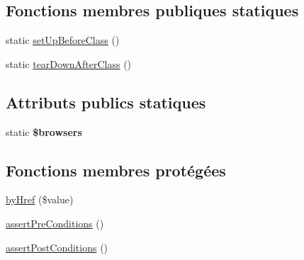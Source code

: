 \subsection*{Fonctions membres publiques statiques}
\begin{DoxyCompactItemize}
\item 
static \hyperlink{classtest_1_1functional_1_1TourneesDeLivraisonFunctionalTest_ac009c03b7cb820b74b75e188d480ca95}{set\+Up\+Before\+Class} ()
\item 
static \hyperlink{classtest_1_1functional_1_1TourneesDeLivraisonFunctionalTest_a33a0b4537f43e5c27ca01824b33cb8db}{tear\+Down\+After\+Class} ()
\end{DoxyCompactItemize}
\subsection*{Attributs publics statiques}
\begin{DoxyCompactItemize}
\item 
static {\bfseries \$browsers}
\end{DoxyCompactItemize}
\subsection*{Fonctions membres protégées}
\begin{DoxyCompactItemize}
\item 
\hyperlink{classtest_1_1functional_1_1TourneesDeLivraisonFunctionalTest_aaf45447e722a49cdc609cb990bf968e0}{by\+Href} (\$value)
\item 
\hyperlink{classtest_1_1functional_1_1TourneesDeLivraisonFunctionalTest_a747dd3fb17e8a4f21d7eb8b7d3848e38}{assert\+Pre\+Conditions} ()
\item 
\hyperlink{classtest_1_1functional_1_1TourneesDeLivraisonFunctionalTest_ad36c142208c9014f5296bcb9090eddc2}{assert\+Post\+Conditions} ()
\end{DoxyCompactItemize}
